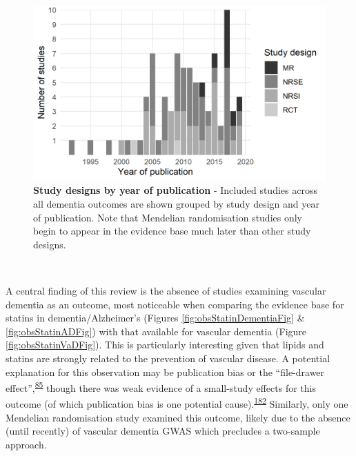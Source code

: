 \documentclass[a4paper, twoside]{templates/ociamthesis}
\begin{document}
~





\begin{figure}[H]
\includegraphics[width=1\linewidth]{figures/sys-rev/type_by_year} \caption[Study designs by year of publication]{\textbf{Study designs by year of publication} - Included studies across all dementia outcomes are shown grouped by study design and year of publication. Note that Mendelian randomisation studies only begin to appear in the evidence base much later than other study designs.}\label{fig:typeByYear}
\end{figure}

~

A central finding of this review is the absence of studies examining vascular dementia as an outcome, most noticeable when comparing the evidence base for statins in dementia/Alzheimer's (Figures \ref{fig:obsStatinDementiaFig} \& \ref{fig:obsStatinADFig}) with that available for vascular dementia (Figure \ref{fig:obsStatinVaDFig}). This is particularly interesting given that lipids and statins are strongly related to the prevention of vascular disease. A potential explanation for this observation may be publication bias or the ``file-drawer effect'',\textsuperscript{\protect\hyperlink{ref-rosenthal1979}{85}} though there was weak evidence of a small-study effects for this outcome (of which publication bias is one potential cause).\textsuperscript{\protect\hyperlink{ref-sterne2011}{182}} Similarly, only one Mendelian randomisation study examined this outcome, likely due to the absence (until recently) of vascular dementia GWAS which precludes a two-sample approach.
\end{document}
